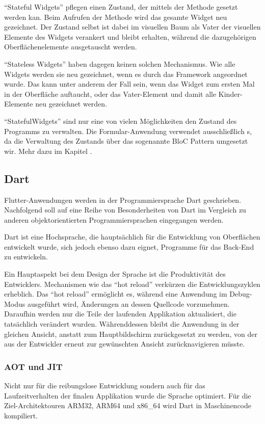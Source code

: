 \enquote{Stateful Widgets} pflegen einen Zustand, der mittels der Methode  gesetzt werden kan.
Beim Aufrufen der Methode wird das gesamte Widget neu gezeichnet.
Der Zustand selbst ist dabei im visuellen Baum als Vater der visuellen Elemente des Widgets verankert und bleibt erhalten, während die dazugehörigen Oberflächenelemente ausgetauscht werden.

\enquote{Stateless Widgets} haben dagegen keinen solchen Mechanismus.
Wie alle Widgets werden sie neu gezeichnet, wenn es durch das Framework angeordnet wurde.
Das kann unter anderem der Fall sein, wenn das Widget zum ersten Mal in der Oberfläche auftaucht, oder das Vater-Element und damit alle Kinder-Elemente neu gezeichnet werden.

\enquote{StatefulWidgets} sind nur eine von vielen Möglichkeiten den Zustand des Programms zu verwalten.
Die Formular-Anwendung verwendet ausschließlich s, da die Verwaltung des Zustands über das sogenannte BloC Pattern umgesetzt wir.
Mehr dazu im Kapitel .


\subsection{Dart}

Flutter-Anwendungen werden in der Programmiersprache Dart geschrieben.
Nachfolgend soll auf eine Reihe von Besonderheiten von Dart im Vergleich zu anderen objektorientierten Programmiersprachen eingegangen werden.

Dart ist eine Hochsprache, die hauptsächlich für die Entwicklung von Oberflächen entwickelt wurde, sich jedoch ebenso dazu eignet, Programme für das Back-End zu entwickeln.

Ein Hauptaspekt bei dem Design der Sprache ist die Produktivität des Entwicklers.
Mechanismen wie das \enquote{hot reload} verkürzen die Entwicklungszyklen erheblich.
Das \enquote{hot reload} ermöglicht es, während eine Anwendung im Debug-Modus ausgeführt wird, Änderungen an dessen Quellcode vorzunehmen.
Daraufhin werden nur die Teile der laufenden Applikation aktualisiert, die tatsächlich verändert wurden.
 Währenddessen bleibt die Anwendung in der gleichen Ansicht, anstatt zum Hauptbildschirm zurückgesetzt zu werden, von der aus der Entwickler erneut zur gewünschten Ansicht zurücknavigieren müsste.

\subsubsection{AOT und JIT}
Nicht nur für die reibungslose Entwicklung sondern auch für das Laufzeitverhalten der finalen Applikation wurde die Sprache optimiert.
Für die Ziel-Architektouren ARM32, ARM64 und x86_64 wird Dart in Maschinencode kompiliert.

